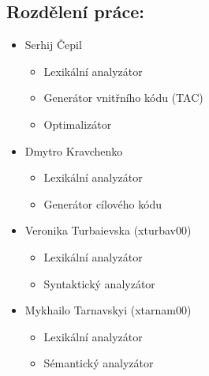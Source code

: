 \begin{flushleft}
    \large
    \section{Rozdělení práce:}
    \begin{itemize}
        \item Serhij Čepil\\
        \begin{itemize}
            \item Lexikální analyzátor
            \item Generátor vnitřního kódu (TAC)
            \item Optimalizátor
        \end{itemize}
        \item Dmytro Kravchenko\\
        \begin{itemize}
            \item Lexikální analyzátor
            \item Generátor cílového kódu
        \end{itemize}
        \item Veronika Turbaievska (xturbav00)\\
        \begin{itemize}
            \item Lexikální analyzátor
            \item Syntaktický analyzátor
        \end{itemize}
        \item Mykhailo Tarnavskyi (xtarnam00)\\
        \begin{itemize}
            \item Lexikální analyzátor
            \item Sémantický analyzátor
        \end{itemize}
    \end{itemize}
    \large

\end{flushleft}

